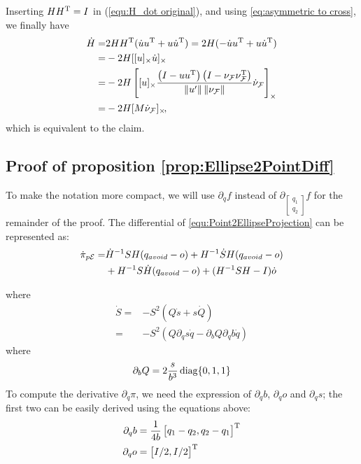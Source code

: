 \documentclass[journal]{IEEEtran}  %
\begin{document}
    Inserting $HH^\mathrm{T}=I$ in (\ref{equ:H_dot original}), and using \ref{eq:asymmetric to cross}, we finally have
    \begin{equation}
      \begin{split}
        \dot H =  &  2H H^\mathrm{T}(\dot u u^\mathrm{T} + u \dot u^\mathrm{T})
        =  2 H (-\dot u u^\mathrm{T} + u \dot u^\mathrm{T})\\
        =  &  -2H [[u]_{\times} \dot u]_{\times} \\
        = &  -2 H \left[ [u]_{\times}  \frac{ \left( I - u u^\mathrm{T} \right) \left( I- \nu_{\mathcal{F}} \nu_{\mathcal{F}}^\mathrm{T} \right)} {\left\|u'\right\| \left\|\nu_{\mathcal{F}}\right\|} \dot{\nu}_{\mathcal{F}}\right]_{\times}\\
        = & -2 H [M \dot{\nu}_{\mathcal{F}}]_{\times}\!,
      \end{split}
    \end{equation}
    which is equivalent to the claim.
  
  \subsection{Proof of proposition \ref{prop:Ellipse2PointDiff}}\label{proof:Ellipse2PointDiff}
      To make the notation more compact, we will use $\partial_q f$ instead of $\partial_{\left[\begin{smallmatrix}q_1\\q_2\end{smallmatrix}\right]} f$ for the remainder of the proof.
    The differential of \eqref{equ:Point2EllipseProjection} can be represented as:
    \begin{equation}\label{equ:dPi_dt}
      \begin{split}
        \dot \pi_{p\mathcal{E}} = &  \dot H^{-1}SH (q_{avoid} - o)  + H^{-1}\dot S H (q_{avoid} - o) \\
        &+ H^{-1}S \dot H (q_{avoid} - o) + (H^{-1}SH -I)\dot o\\
      \end{split}
    \end{equation}

    where
    \begin{equation}\label{equ:S_dot}
      \begin{split}
        \dot S  =& - S^2 (Q \dot s + s \dot Q)\\
        =& - S^2 (Q \partial_q s \dot q - \partial_b Q \partial_q b \dot q)
      \end{split}
    \end{equation}
    where
    \begin{equation}
      \partial_b Q = 2\frac{s}{b^3} \operatorname{diag}\{0,1,1\}
    \end{equation}
    To compute the derivative $\partial_q \pi$, we need the expression of $\partial_q b$, $\partial_q o$ and $\partial_q s$; the first two can be easily derived using the equations above:
    \begin{align}
      \partial_q b &= \frac{1}{4b}\begin{bmatrix}q_1-q_2,q_2-q_1\end{bmatrix}^\mathrm{T}\\
      \partial_q o &= \begin{bmatrix}I/2,I/2\end{bmatrix}^\mathrm{T}
    \end{align}
\end{document}
